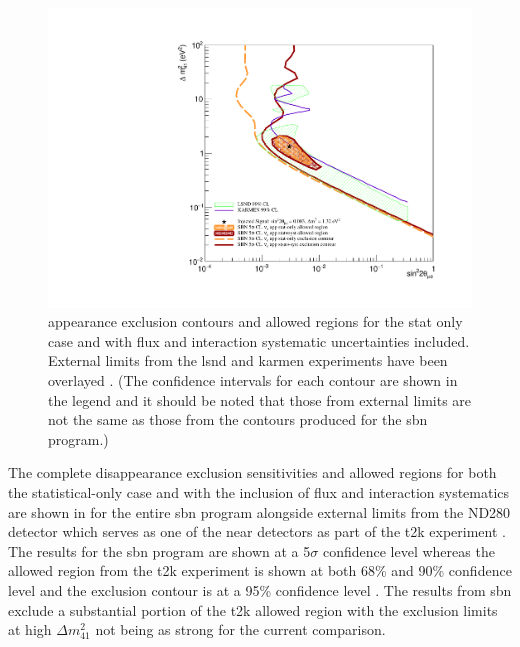 \begin{figure}[h!]
    \centering
    \includegraphics[width = \largefigwidth]{figures-chap6/overlays/valor_overlays_nue_app.pdf}
    \caption[\nue appearance contours with external limits.]{\nue appearance exclusion contours and allowed regions for the stat only case and with flux and interaction systematic uncertainties included. External limits from the \gls{lsnd} and \gls{karmen} experiments have been overlayed \cite{LSND_KARMEN_nue_app_contour}. (The confidence intervals for each contour are shown in the legend and it should be noted that those from external limits are not the same as those from the contours produced for the \gls{sbn} program.)}
    \label{fig:nue_app_global_sensitivity}
\end{figure}

The complete \nue disappearance exclusion sensitivities and allowed regions for both the statistical-only case and with the inclusion of flux and interaction systematics are shown in  for the entire \gls{sbn} program alongside external limits from the ND280 detector which serves as one of the near detectors as part of the \gls{t2k} experiment \cite{t2k_experiment}. The results for the \gls{sbn} program are shown at a 5$\sigma$ confidence level whereas the allowed region from the \gls{t2k} experiment is shown at both 68\% and 90\% confidence level and the exclusion contour is at a 95\% confidence level \cite{T2K_nue_disapp_contour}. The results from \gls{sbn} exclude a substantial portion of the \gls{t2k} allowed region with the exclusion limits at high $\Delta m^2_{41}$ not being as strong for the current comparison. 

